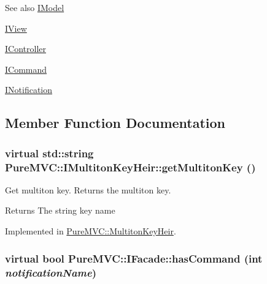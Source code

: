 \begin{DoxySeeAlso}{See also}
\hyperlink{class_pure_m_v_c_1_1_i_model}{IModel} 

\hyperlink{class_pure_m_v_c_1_1_i_view}{IView} 

\hyperlink{class_pure_m_v_c_1_1_i_controller}{IController} 

\hyperlink{class_pure_m_v_c_1_1_i_command}{ICommand} 

\hyperlink{class_pure_m_v_c_1_1_i_notification}{INotification} 
\end{DoxySeeAlso}


\subsection{Member Function Documentation}
\hypertarget{class_pure_m_v_c_1_1_i_multiton_key_heir_aecccfb9898368c6377550ceae5730934}{
\subsubsection[{getMultitonKey}]{\setlength{\rightskip}{0pt plus 5cm}virtual std::string PureMVC::IMultitonKeyHeir::getMultitonKey ()}}
\label{class_pure_m_v_c_1_1_i_multiton_key_heir_aecccfb9898368c6377550ceae5730934}


Get multiton key. Returns the multiton key. \begin{DoxyReturn}{Returns}
The string key name 
\end{DoxyReturn}


Implemented in \hyperlink{class_pure_m_v_c_1_1_multiton_key_heir_aa5622459d33380deb08dc3cab8b991c7}{PureMVC::MultitonKeyHeir}.\hypertarget{class_pure_m_v_c_1_1_i_facade_abeb340386026eaa9218e8581cda6a12d}{
\subsubsection[{hasCommand}]{\setlength{\rightskip}{0pt plus 5cm}virtual bool PureMVC::IFacade::hasCommand (int {\em notificationName})}}
\label{class_pure_m_v_c_1_1_i_facade_abeb340386026eaa9218e8581cda6a12d}


